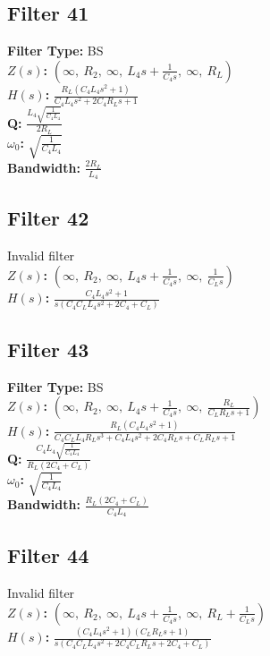 \documentclass{article}
\begin{document}
\subsection*{Filter 41}
\textbf{Filter Type:} BS \\ 
\textbf{$Z(s)$:} $\left( \infty, \  R_{2}, \  \infty, \  L_{4} s + \frac{1}{C_{4} s}, \  \infty, \  R_{L}\right)$ \\ 
\textbf{$H(s)$:} $\frac{R_{L} \left(C_{4} L_{4} s^{2} + 1\right)}{C_{4} L_{4} s^{2} + 2 C_{4} R_{L} s + 1}$ \\ 
\textbf{Q:} $\frac{L_{4} \sqrt{\frac{1}{C_{4} L_{4}}}}{2 R_{L}}$ \\ 
\textbf{$\omega_0$:} $\sqrt{\frac{1}{C_{4} L_{4}}}$ \\ 
\textbf{Bandwidth:} $\frac{2 R_{L}}{L_{4}}$ \\ 
\subsection*{Filter 42}
Invalid filter \\ 
\textbf{$Z(s)$:} $\left( \infty, \  R_{2}, \  \infty, \  L_{4} s + \frac{1}{C_{4} s}, \  \infty, \  \frac{1}{C_{L} s}\right)$ \\ 
\textbf{$H(s)$:} $\frac{C_{4} L_{4} s^{2} + 1}{s \left(C_{4} C_{L} L_{4} s^{2} + 2 C_{4} + C_{L}\right)}$ \\ 
\subsection*{Filter 43}
\textbf{Filter Type:} BS \\ 
\textbf{$Z(s)$:} $\left( \infty, \  R_{2}, \  \infty, \  L_{4} s + \frac{1}{C_{4} s}, \  \infty, \  \frac{R_{L}}{C_{L} R_{L} s + 1}\right)$ \\ 
\textbf{$H(s)$:} $\frac{R_{L} \left(C_{4} L_{4} s^{2} + 1\right)}{C_{4} C_{L} L_{4} R_{L} s^{3} + C_{4} L_{4} s^{2} + 2 C_{4} R_{L} s + C_{L} R_{L} s + 1}$ \\ 
\textbf{Q:} $\frac{C_{4} L_{4} \sqrt{\frac{1}{C_{4} L_{4}}}}{R_{L} \left(2 C_{4} + C_{L}\right)}$ \\ 
\textbf{$\omega_0$:} $\sqrt{\frac{1}{C_{4} L_{4}}}$ \\ 
\textbf{Bandwidth:} $\frac{R_{L} \left(2 C_{4} + C_{L}\right)}{C_{4} L_{4}}$ \\ 
\subsection*{Filter 44}
Invalid filter \\ 
\textbf{$Z(s)$:} $\left( \infty, \  R_{2}, \  \infty, \  L_{4} s + \frac{1}{C_{4} s}, \  \infty, \  R_{L} + \frac{1}{C_{L} s}\right)$ \\ 
\textbf{$H(s)$:} $\frac{\left(C_{4} L_{4} s^{2} + 1\right) \left(C_{L} R_{L} s + 1\right)}{s \left(C_{4} C_{L} L_{4} s^{2} + 2 C_{4} C_{L} R_{L} s + 2 C_{4} + C_{L}\right)}$ \\ 
\end{document}
